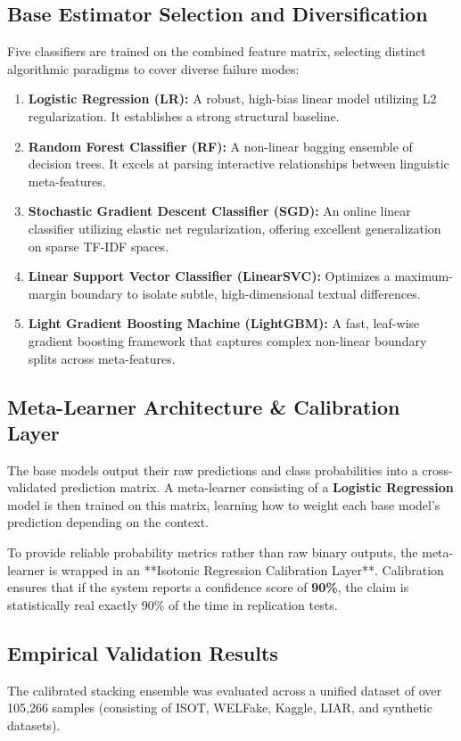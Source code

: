 \documentclass[11pt,a4paper,oneside]{article}
\begin{document}
\subsection{Base Estimator Selection and Diversification}
Five classifiers are trained on the combined feature matrix, selecting distinct algorithmic paradigms to cover diverse failure modes:
\begin{enumerate}
    \item \textbf{Logistic Regression (LR):} A robust, high-bias linear model utilizing L2 regularization. It establishes a strong structural baseline.
    \item \textbf{Random Forest Classifier (RF):} A non-linear bagging ensemble of decision trees. It excels at parsing interactive relationships between linguistic meta-features.
    \item \textbf{Stochastic Gradient Descent Classifier (SGD):} An online linear classifier utilizing elastic net regularization, offering excellent generalization on sparse TF-IDF spaces.
    \item \textbf{Linear Support Vector Classifier (LinearSVC):} Optimizes a maximum-margin boundary to isolate subtle, high-dimensional textual differences.
    \item \textbf{Light Gradient Boosting Machine (LightGBM):} A fast, leaf-wise gradient boosting framework that captures complex non-linear boundary splits across meta-features.
\end{enumerate}

\subsection{Meta-Learner Architecture & Calibration Layer}
The base models output their raw predictions and class probabilities into a cross-validated prediction matrix. A meta-learner consisting of a \textbf{Logistic Regression} model is then trained on this matrix, learning how to weight each base model's prediction depending on the context.

To provide reliable probability metrics rather than raw binary outputs, the meta-learner is wrapped in an **Isotonic Regression Calibration Layer**. Calibration ensures that if the system reports a confidence score of \textbf{90\%}, the claim is statistically real exactly 90\% of the time in replication tests.

\subsection{Empirical Validation Results}
The calibrated stacking ensemble was evaluated across a unified dataset of over 105,266 samples (consisting of ISOT, WELFake, Kaggle, LIAR, and synthetic datasets). 
\end{document}
